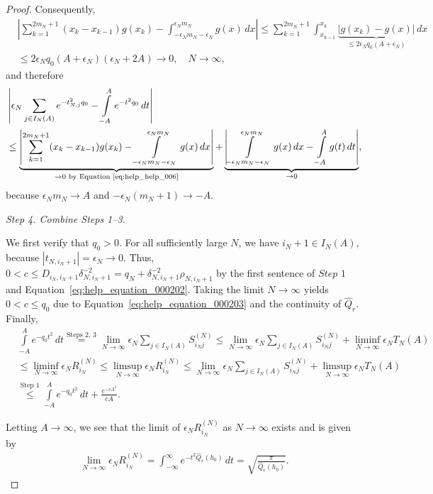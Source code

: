 \begin{proof}
    Consequently,
    \begin{equation}\label{eq:help_help_006}
        \begin{aligned}
            &\left|\sum_{k=1}^{2m_N+1}(x_k-x_{k-1})g(x_k)-\int_{-\epsilon_Nm_N-\epsilon_N}^{\epsilon_Nm_N}g(x)\,dx\right|\le\sum_{k=1}^{2m_N+1}\int_{x_{k-1}}^{x_k}\underbrace{|g(x_k)-g(x)|}_{\le2\epsilon_Nq_0(A+\epsilon_N)}\,dx\\&
        \le2\epsilon_Nq_0(A+\epsilon_N)(\epsilon_N+2A)\to0,\quad N\to\infty,
        \end{aligned}
    \end{equation}
    and therefore
    \begin{equation}\label{eq:help_help_007}
        \begin{aligned}
            &\left|\epsilon_N\sum_{j\in I_N(A)}e^{-t_{N,j}^2q_0}-\int\limits_{-A}^{A}e^{-t^2q_0}\,dt\right|\\&
            \le\underbrace{\left|\sum_{k=1}^{2m_N+1}(x_k-x_{k-1})g(x_k)-\int\limits_{-\epsilon_Nm_N-\epsilon_N}^{\epsilon_Nm_N}g(x)\,dx\right|}_{\to0\text{ by Equation~\eqref{eq:help_help_006}}}+\underbrace{\left|\int\limits_{-\epsilon_Nm_N-\epsilon_N}^{\epsilon_Nm_N}g(x)\,dx-\int\limits_{-A}^{A}g(t)\,dt\right|}_{\to0},
        \end{aligned}
    \end{equation}
    because $\epsilon_Nm_N\to A$ and $-\epsilon_N(m_N+1)\to-A$.

    \textit{Step 4. Combine Steps 1--3.}

    We first verify that $q_0>0$. For all sufficiently large $N$, we have $i_N+1\in I_N(A)$, because $|t_{N,i_N+1}|=\epsilon_N\to0$. Thus, $0<c\le D_{i_N,i_N+1}\delta_{N,i_N+1}^{-2}=q_N+\delta_{N,i_N+1}^{-2}\rho_{N,i_N+1}$ by the first sentence of $\textit{Step 1}$ and Equation~\eqref{eq:help_equation_000202}. Taking the limit $N\to\infty$ yields $0<c\le q_0$ due to Equation~\eqref{eq:help_equation_000203} and the continuity of $\hat{Q}_r$. Finally,
    \begin{align*}
        &\int\limits_{-A}^{A}e^{-q_0t^2}\,dt\stackrel{\text{Steps 2, 3}}{=}\lim_{N\to\infty}\epsilon_N\sum_{j\in I_N(A)}S_{i_Nj}^{(N)}\le\lim_{N\to\infty}\epsilon_N\sum_{j\in I_N(A)}S_{i_Nj}^{(N)}+\liminf_{N\to\infty}\epsilon_NT_N(A)\\&
        \le\liminf_{N\to\infty}\epsilon_NR_{i_N}^{(N)}\le\limsup_{N\to\infty}\epsilon_NR_{i_N}^{(N)}\le\lim_{N\to\infty}\epsilon_N\sum_{j\in I_N(A)}S_{i_Nj}^{(N)}+\limsup_{N\to\infty}\epsilon_NT_N(A)\\&
        \stackrel{\text{Step 1}}{\le}\int\limits_{-A}^Ae^{-q_0t^2}\,dt+\frac{e^{-cA^2}}{cA}.
    \end{align*}
    
    Letting $A\to\infty$, we see that the limit of $\epsilon_NR_{i_N}^{(N)}$ as $N\to\infty$ exists and is given by
    \begin{align*}
        \lim_{N\to\infty}\epsilon_NR_{i_N}^{(N)}=\int_{-\infty}^{\infty}e^{-t^2\hat{Q}_r(h_0)}\,dt=\sqrt{\frac{\pi}{\hat{Q}_r(h_0)}}.
    \end{align*}
\end{proof}

